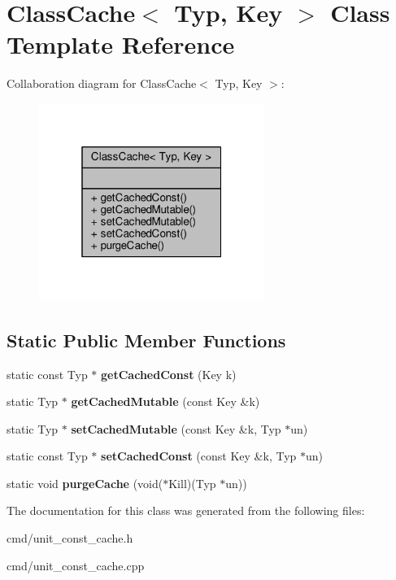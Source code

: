 \hypertarget{classClassCache}{}\section{Class\+Cache$<$ Typ, Key $>$ Class Template Reference}
\label{classClassCache}


Collaboration diagram for Class\+Cache$<$ Typ, Key $>$\+:
\nopagebreak
\begin{figure}[H]
\begin{center}
\leavevmode
\includegraphics[width=208pt]{d8/d8e/classClassCache__coll__graph}
\end{center}
\end{figure}
\subsection*{Static Public Member Functions}
\begin{DoxyCompactItemize}
\item 
static const Typ $\ast$ {\bfseries get\+Cached\+Const} (Key k)\hypertarget{classClassCache_a2c586dfc54618aa7d3f067d9f699fd4c}{}\label{classClassCache_a2c586dfc54618aa7d3f067d9f699fd4c}

\item 
static Typ $\ast$ {\bfseries get\+Cached\+Mutable} (const Key \&k)\hypertarget{classClassCache_ae668286ec7b7391d70d62d073e705d96}{}\label{classClassCache_ae668286ec7b7391d70d62d073e705d96}

\item 
static Typ $\ast$ {\bfseries set\+Cached\+Mutable} (const Key \&k, Typ $\ast$un)\hypertarget{classClassCache_a54c02833b036cfd1daf30e93c06c2b2b}{}\label{classClassCache_a54c02833b036cfd1daf30e93c06c2b2b}

\item 
static const Typ $\ast$ {\bfseries set\+Cached\+Const} (const Key \&k, Typ $\ast$un)\hypertarget{classClassCache_ae4b18df71ed5e0dd8a36a3db5fe034ec}{}\label{classClassCache_ae4b18df71ed5e0dd8a36a3db5fe034ec}

\item 
static void {\bfseries purge\+Cache} (void($\ast$Kill)(Typ $\ast$un))\hypertarget{classClassCache_aa54b20b87ab2ce07abd5ff6dbbac3391}{}\label{classClassCache_aa54b20b87ab2ce07abd5ff6dbbac3391}

\end{DoxyCompactItemize}


The documentation for this class was generated from the following files\+:\begin{DoxyCompactItemize}
\item 
cmd/unit\+\_\+const\+\_\+cache.\+h\item 
cmd/unit\+\_\+const\+\_\+cache.\+cpp\end{DoxyCompactItemize}
